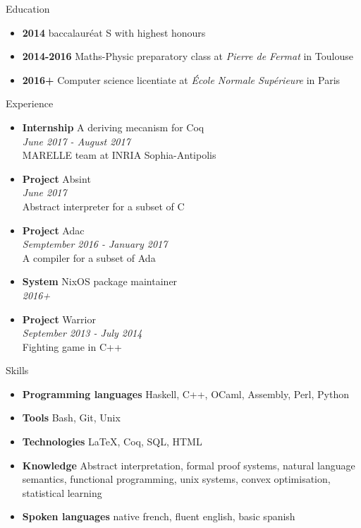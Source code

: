 \documentclass[a4paper,14pt]{extarticle}
\newcommand{\cvtitle}[1]{
    \begin{tcolorbox}[colback=bgcol,colframe=ForestGreen,
        height=1cm, valign=center, sharp corners=downhill]
        {\Large #1}
    \end{tcolorbox}
}
\begin{document}
    \begin{minipage}[c][282mm][t]{0.60\linewidth}

        \cvtitle{Education}

        \begin{itemize}
            \item \textbf{2014} baccalauréat S with highest honours
            \item \textbf{2014-2016} Maths-Physic preparatory class at \emph{Pierre de Fermat} in Toulouse
            \item \textbf{2016+} Computer science licentiate at \emph{École Normale Supérieure} in Paris
        \end{itemize}

        \cvtitle{Experience}

        \begin{itemize}
            \item \textbf{Internship} A deriving mecanism for Coq \\
                \emph{June 2017 - August 2017} \\
                MARELLE team at INRIA Sophia-Antipolis
            \item \textbf{Project} Absint \\
                \emph{June 2017} \\
                Abstract interpreter for a subset of C
            \item \textbf{Project} Adac \\
                \emph{Semptember 2016 - January 2017} \\
                A compiler for a subset of Ada
            \item \textbf{System} NixOS package maintainer \\
                \emph{2016+}
            \item \textbf{Project} Warrior \\
                \emph{September 2013 - July 2014} \\
                Fighting game in C++
        \end{itemize}

        \cvtitle{Skills}

        \begin{itemize}
            \item \textbf{Programming languages} Haskell, C++, OCaml, Assembly, Perl, Python
            \item \textbf{Tools} Bash, Git, Unix
            \item \textbf{Technologies} \LaTeX, Coq, SQL, HTML
            \item \textbf{Knowledge} Abstract interpretation, formal proof systems, natural language semantics,
                functional programming, unix systems, convex optimisation, statistical learning
            \item \textbf{Spoken languages} native french, fluent english, basic spanish
        \end{itemize}

    \end{minipage}
\end{document}
